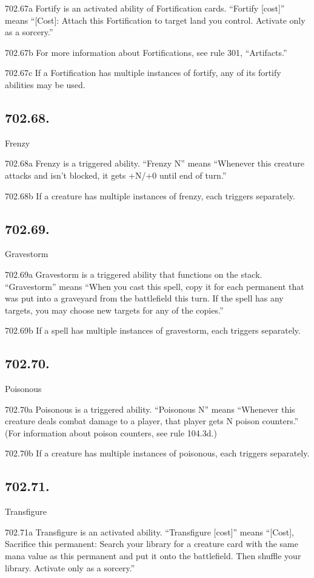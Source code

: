 702.67a Fortify is an activated ability of Fortification cards. “Fortify [cost]” means “[Cost]: Attach this Fortification to target land you control. Activate only as a sorcery.”

702.67b For more information about Fortifications, see rule 301, “Artifacts.”

702.67c If a Fortification has multiple instances of fortify, any of its fortify abilities may be used.

\subsection*{702.68.}
Frenzy

702.68a Frenzy is a triggered ability. “Frenzy N” means “Whenever this creature attacks and isn’t blocked, it gets +N/+0 until end of turn.”

702.68b If a creature has multiple instances of frenzy, each triggers separately.

\subsection*{702.69.}
Gravestorm

702.69a Gravestorm is a triggered ability that functions on the stack. “Gravestorm” means “When you cast this spell, copy it for each permanent that was put into a graveyard from the battlefield this turn. If the spell has any targets, you may choose new targets for any of the copies.”

702.69b If a spell has multiple instances of gravestorm, each triggers separately.

\subsection*{702.70.}
Poisonous

702.70a Poisonous is a triggered ability. “Poisonous N” means “Whenever this creature deals combat damage to a player, that player gets N poison counters.” (For information about poison counters, see rule 104.3d.)

702.70b If a creature has multiple instances of poisonous, each triggers separately.

\subsection*{702.71.}
Transfigure

702.71a Transfigure is an activated ability. “Transfigure [cost]” means “[Cost], Sacrifice this permanent: Search your library for a creature card with the same mana value as this permanent and put it onto the battlefield. Then shuffle your library. Activate only as a sorcery.”

